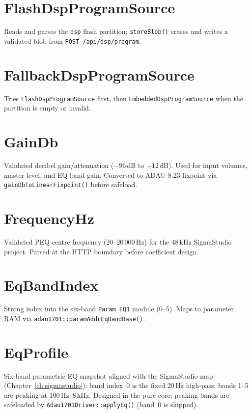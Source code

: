 \section{FlashDspProgramSource}\label{cls:FlashDspProgramSource}
Reads and parses the \texttt{dsp} flash partition; \texttt{storeBlob()} erases
and writes a validated blob from \texttt{POST /api/dsp/program}.

\section{FallbackDspProgramSource}\label{cls:FallbackDspProgramSource}
Tries \texttt{FlashDspProgramSource} first, then
\texttt{EmbeddedDspProgramSource} when the partition is empty or invalid.


\section{GainDb}\label{cls:GainDb}
Validated decibel gain/attenuation ($-96$\,dB to $+12$\,dB). Used for
input volumes, master level, and EQ band gain. Converted to ADAU 8.23
fixpoint via \texttt{gainDbToLinearFixpoint()} before safeload.

\section{FrequencyHz}\label{cls:FrequencyHz}
Validated PEQ centre frequency (20--20\,000\,Hz) for the 48\,kHz
SigmaStudio project. Parsed at the HTTP boundary before coefficient design.

\section{EqBandIndex}\label{cls:EqBandIndex}
Strong index into the six-band \texttt{Param EQ1} module (0--5). Maps to
parameter RAM via \texttt{adau1701::paramAddrEqBandBase()}.

\section{EqProfile}\label{cls:EqProfile}
Six-band parametric EQ snapshot aligned with the SigmaStudio map
(Chapter~\ref{ch:sigmastudio}): band index~0 is the fixed 20\,Hz
high-pass; bands 1--5 are peaking at 100\,Hz--8\,kHz. Designed in the
pure core; peaking bands are safeloaded by \texttt{Adau1701Driver::applyEq()}
(band~0 is skipped).

